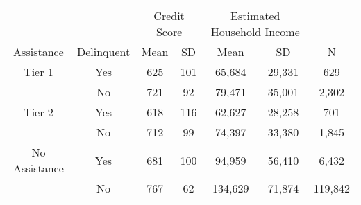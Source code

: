 \begin{tabular}{ccccccc}
\toprule 
\midrule 
\multicolumn{2}{c}{} & \multicolumn{2}{c}{Credit Score} & \multicolumn{2}{c}{Estimated Household Income} &  \\
 \cmidrule(lr){3-4} \cmidrule(lr){5-6} 
Assistance & Delinquent & Mean & SD & Mean & SD & N \\
\midrule 
Tier 1 & Yes & 625 & 101 & 65,684 & 29,331 & 629 \\
 & No & 721 & 92 & 79,471 & 35,001 & 2,302 \\
\midrule 
Tier 2 & Yes & 618 & 116 & 62,627 & 28,258 & 701 \\
 & No & 712 & 99 & 74,397 & 33,380 & 1,845 \\
\midrule 
No Assistance & Yes & 681 & 100 & 94,959 & 56,410 & 6,432 \\
 & No & 767 & 62 & 134,629 & 71,874 & 119,842 \\
\midrule 
\bottomrule 
\end{tabular}
